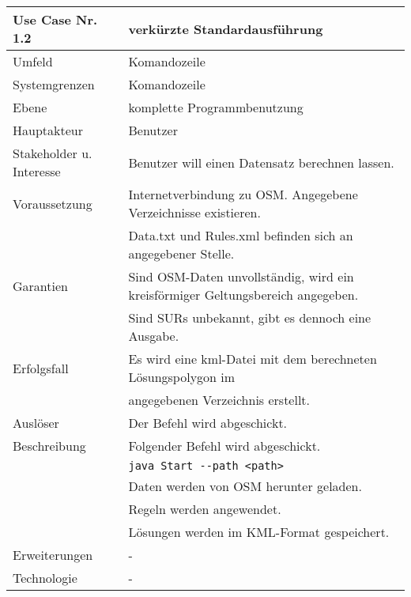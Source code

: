 \begin{tabular}{| l | l |}
 \hline
 \textbf{Use Case Nr. 1.2} & verkürzte Standardausführung\\
 \hline
 Umfeld & Komandozeile\\
 \hline
 Systemgrenzen & Komandozeile\\
 \hline
 Ebene & komplette Programmbenutzung\\
 \hline
 Hauptakteur & Benutzer\\
 \hline
 Stakeholder u. Interesse & Benutzer will einen Datensatz berechnen lassen.\\
 \hline
 Voraussetzung & Internetverbindung zu OSM. Angegebene Verzeichnisse existieren.\\
        & Data.txt und Rules.xml befinden sich an angegebener Stelle. \\
 \hline
 Garantien & Sind OSM-Daten unvollständig, wird ein kreisförmiger Geltungsbereich angegeben.\\
    & Sind SURs unbekannt, gibt es dennoch eine Ausgabe.\\
 \hline
 Erfolgsfall & Es wird eine kml-Datei mit dem berechneten Lösungspolygon im\\
      & angegebenen Verzeichnis erstellt.\\
 \hline
 Auslöser & Der Befehl wird abgeschickt.\\
 \hline
 Beschreibung & Folgender Befehl wird abgeschickt.\\
      & \verb|java Start --path <path>|\\
      & Daten werden von OSM herunter geladen.\\
      & Regeln werden angewendet.\\
      & Lösungen werden im KML-Format gespeichert.\\
 \hline
 Erweiterungen & -\\
 \hline
 Technologie & -\\
 \hline
\end{tabular}



